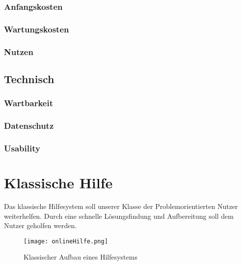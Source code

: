 \subsubsection{Anfangskosten}
\subsubsection{Wartungskosten}
\subsubsection{Nutzen}
\subsection{Technisch}
\subsubsection{Wartbarkeit}
\subsubsection{Datenschutz}
\subsubsection{Usability}

\section{Klassische Hilfe}
Das klassische Hilfesystem soll unserer Klasse der Problemorientierten Nutzer weiterhelfen. Durch eine schnelle Lösungsfindung und Aufbereitung soll dem Nutzer geholfen werden.

\begin{figure}[ht]
\begin{center}
\texttt{[image: onlineHilfe.png]}
\caption{Klassischer Aufbau eines Hilfesystems}
\label{img1:userRoles}
\end{center}
\end{figure} 
